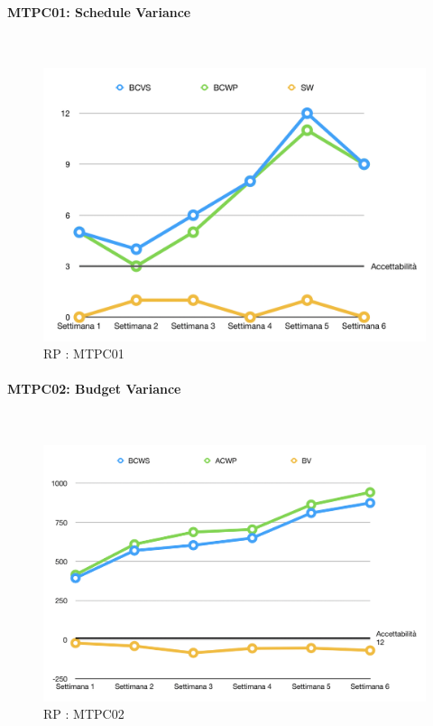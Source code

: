 \paragraph{MTPC01: Schedule Variance}\-\\
\begin{figure}[H]
	\begin{center}
		\includegraphics[scale=0.5]{./images/grafici_RP/MTPC01.png} 
	\end{center}
	\caption{RP : MTPC01}
\end{figure}

\paragraph{MTPC02: Budget Variance}\-\\
\begin{figure}[H]
	\begin{center}
		\includegraphics[scale=0.5]{./images/grafici_RP/MTPC02.png} 
	\end{center}
	\caption{RP : MTPC02}
\end{figure}

